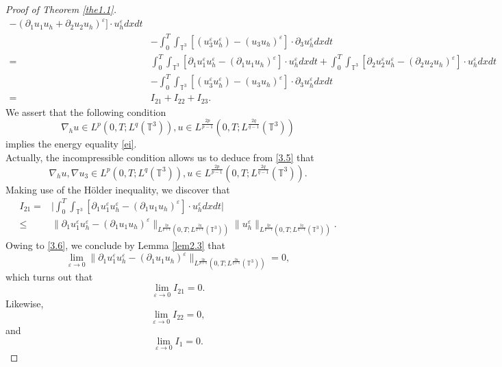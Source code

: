 \documentclass[11pt]{article}
\theoremstyle{plain}\newtheorem{definition}{Definition}[section]
\theoremstyle{definition}\newtheorem{theorem}{Theorem}[section]
\theoremstyle{plain}\newtheorem{lemma}[theorem]{Lemma}
\theoremstyle{plain}\newtheorem{coro}[theorem]{Corollary}
\theoremstyle{plain}\newtheorem{prop}[theorem]{Proposition}
\theoremstyle{remark}\newtheorem{remark}{Remark}[section]
\newcommand{\B}{\Big}
\newcommand{\be}{\begin{equation}}
\newcommand{\ee}{\end{equation}}
\newcommand{\ba}{\begin{aligned}}
\newcommand{\ea}{\end{aligned}}
\newcommand{\f}{\frac}
\numberwithin{equation}{section}
\begin{document}
\begin{proof}[Proof of Theorem \ref{the1.1}]
\begin{align}
-(\partial_{1} u_{1} u_{h}+\partial_{2} u_{2} u_{h})^{\varepsilon}]\cdot u_{h}^{\varepsilon} dxdt\nonumber
\\&-\int_{0}^{T}\int_{\mathbb{T}^{3}} [(u_{3}^{\varepsilon} u_{h}^{\varepsilon})-(  u_{3} u_{h})^{\varepsilon}]\cdot \partial_{3}u_{h}^{\varepsilon} dxdt\nonumber\\
=& \int_{0}^{T}\int_{\mathbb{T}^{3}} [\partial_{1}u_{1}^{\varepsilon} u_{h}^{\varepsilon} -(\partial_{1} u_{1} u_{h} )^{\varepsilon}]\cdot u_{h}^{\varepsilon} dxdt+ \int_{0}^{T}\int_{\mathbb{T}^{3}} [\partial_{2}u_{2}^{\varepsilon}u_{h}^{\varepsilon}
-( \partial_{2} u_{2} u_{h})^{\varepsilon}]\cdot u_{h}^{\varepsilon} dxdt\nonumber
\\&-\int_{0}^{T}\int_{\mathbb{T}^{3}} [(u_{3}^{\varepsilon} u_{h}^{\varepsilon})-(  u_{3} u_{h})^{\varepsilon}]\cdot \partial_{3}u_{h}^{\varepsilon} dxdt\nonumber\\
=&I_{21}+I_{22}+I_{23}\label{3.4}.
\end{align}
 We assert that the following condition
\be\label{3.5}
\nabla_{h}u\in L^{p}(0,T;L^{ q}( \mathbb{T}^{3})),u\in L^{\f{2p}{p-1}}(0,T;L^{ \f{2q}{q-1}}( \mathbb{T}^{3}))\ee
implies the energy equality \eqref{ei}.\\
Actually, the incompressible condition allows us to deduce from \eqref{3.5}  that
\be\label{3.6}
\nabla_{h}u, \nabla u_{3} \in L^{p}(0,T;L^{ q}( \mathbb{T}^{3})), u\in   L^{\f{2p}{p-1}}(0,T;L^{ \f{2q}{q-1}}( \mathbb{T}^{3})).
\ee
Making use of the H\"older inequality, we discover that
\be\ba
 I_{21}=&\B|\int_{0}^{T}\int_{\mathbb{T}^{3}} [\partial_{1}u_{1}^{\varepsilon} u_{h}^{\varepsilon} -(\partial_{1} u_{1} u_{h} )^{\varepsilon}]\cdot u_{h}^{\varepsilon} dxdt\B|\\
 \leq & \|\partial_{1}u_{1}^{\varepsilon} u_{h}^{\varepsilon} -(\partial_{1} u_{1} u_{h} )^{\varepsilon}\|_{L^{\f{2p}{p+1}}(0,T;L^{ \f{2q}{q+1}}( \mathbb{T}^{3}))}  \|  u_{h}^{\varepsilon} \|_{L^{\f{2p}{p-1}}(0,T;L^{ \f{2q}{q-1}}( \mathbb{T}^{3}))}.
\ea\ee
Owing to \eqref{3.6},
we conclude by Lemma \eqref{lem2.3} that
\be
\lim_{\varepsilon\rightarrow0}\|\partial_{1}u_{1}^{\varepsilon} u_{h}^{\varepsilon} -(\partial_{1} u_{1} u_{h} )^{\varepsilon}\|_{L^{\f{2p}{p+1}}(0,T;L^{ \f{2q}{q+1}}( \mathbb{T}^{3}))}=0,
\ee
which turns out that
\be\label{3.9}
\lim_{\varepsilon\rightarrow0}I_{21}=0.
\ee
Likewise,
\be\label{3.10}
\lim_{\varepsilon\rightarrow0}I_{22}=0,
\ee
and
\be\label{3.11}
\lim_{\varepsilon\rightarrow0}I_{1}=0.
\ee


\end{proof}
\end{document}
